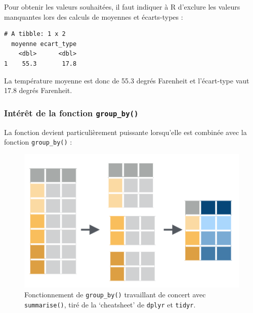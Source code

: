 \documentclass[a4paperpaper,]{article}
\newenvironment{Shaded}{\begin{snugshade}}{\end{snugshade}}
\newcommand{\DataTypeTok}[1]{\textcolor[rgb]{0.00,0.34,0.68}{#1}}
\newcommand{\KeywordTok}[1]{\textcolor[rgb]{0.12,0.11,0.11}{\textbf{#1}}}
\newcommand{\NormalTok}[1]{\textcolor[rgb]{0.12,0.11,0.11}{#1}}
\newcommand{\OperatorTok}[1]{\textcolor[rgb]{0.12,0.11,0.11}{#1}}
\newcommand{\OtherTok}[1]{\textcolor[rgb]{0.00,0.43,0.16}{#1}}
\newcommand{\StringTok}[1]{\textcolor[rgb]{0.75,0.01,0.01}{#1}}
\begin{document}
Pour obtenir les valeurs souhaitées, il faut indiquer à R d'exclure les valeurs manquantes lors des calculs de moyennes et écarts-types :

\begin{Shaded}
\end{Shaded}

\begin{verbatim}
# A tibble: 1 x 2
  moyenne ecart_type
    <dbl>      <dbl>
1    55.3       17.8
\end{verbatim}

La température moyenne est donc de 55.3 degrés Farenheit et l'écart-type vaut 17.8 degrés Farenheit.

\hypertarget{interet-de-la-fonction-group_by}{%
\subsubsection{\texorpdfstring{Intérêt de la fonction \texttt{group\_by()}}{Intérêt de la fonction group\_by()}}\label{interet-de-la-fonction-group_by}}

La fonction devient particulièrement puissante lorsqu'elle est combinée avec la fonction \texttt{group\_by()} :

\begin{figure}[htpb]

{\centering \includegraphics[width=0.65\linewidth]{images/groupby} 

}

\caption{Fonctionnement de \texttt{group\_by()} travaillant de concert avec \texttt{summarise()}, tiré de la `cheatsheet' de \texttt{dplyr} et \texttt{tidyr}.}\label{fig:groupby}
\end{figure}
\end{document}
